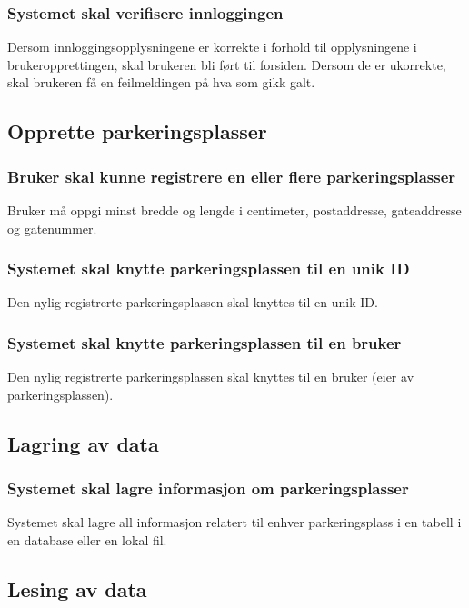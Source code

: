 \documentclass[12pt]{article}
\begin{document}
\subsubsection{Systemet skal verifisere innloggingen}
Dersom innloggingsopplysningene er korrekte i forhold til opplysningene i brukeropprettingen, skal brukeren bli ført til forsiden. Dersom de er ukorrekte, skal brukeren få en feilmeldingen på hva som gikk galt.

\subsection{Opprette parkeringsplasser}

\subsubsection{Bruker skal kunne registrere en eller flere parkeringsplasser}
Bruker må oppgi minst bredde og lengde i centimeter, postaddresse, gateaddresse og gatenummer.

\subsubsection{Systemet skal knytte parkeringsplassen til en unik ID}
Den nylig registrerte parkeringsplassen skal knyttes til en unik ID.

\subsubsection{Systemet skal knytte parkeringsplassen til en bruker}
Den nylig registrerte parkeringsplassen skal knyttes til en bruker (eier av parkeringsplassen).

\subsection{Lagring av data}

\subsubsection{Systemet skal lagre informasjon om parkeringsplasser}
Systemet skal lagre all informasjon relatert til enhver parkeringsplass i en tabell i en database eller en lokal fil.

\subsection{Lesing av data}
\end{document}
